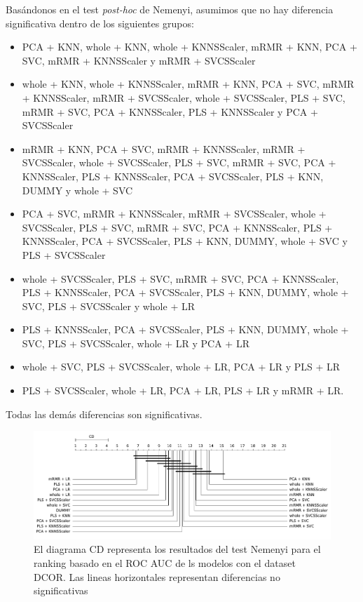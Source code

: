 \documentclass[a4paper,oneside,11pt,leqno]{article}
\begin{document}
	Basándonos en el test \textit{post-hoc} de Nemenyi, asumimos que no hay diferencia significativa dentro de los siguientes grupos:
	
	\begin{itemize}
		\item PCA + KNN, whole + KNN, whole + KNNSScaler, mRMR + KNN, PCA + SVC, mRMR + KNNSScaler y mRMR + SVCSScaler
		
		\item whole + KNN, whole + KNNSScaler, mRMR + KNN, PCA + SVC, mRMR + KNNSScaler, mRMR + SVCSScaler, whole + SVCSScaler, PLS + SVC, mRMR + SVC, PCA + KNNSScaler, PLS + KNNSScaler y PCA + SVCSScaler
		
		\item mRMR + KNN, PCA + SVC, mRMR + KNNSScaler, mRMR + SVCSScaler, whole + SVCSScaler, PLS + SVC, mRMR + SVC, PCA + KNNSScaler, PLS + KNNSScaler, PCA + SVCSScaler, PLS + KNN, DUMMY y whole + SVC
		
		\item PCA + SVC, mRMR + KNNSScaler, mRMR + SVCSScaler, whole + SVCSScaler, PLS + SVC, mRMR + SVC, PCA + KNNSScaler, PLS + KNNSScaler, PCA + SVCSScaler, PLS + KNN, DUMMY, whole + SVC y PLS + SVCSScaler
		
		\item  whole + SVCSScaler, PLS + SVC, mRMR + SVC, PCA + KNNSScaler, PLS + KNNSScaler, PCA + SVCSScaler, PLS + KNN, DUMMY, whole + SVC, PLS + SVCSScaler y whole + LR
		
		\item PLS + KNNSScaler, PCA + SVCSScaler, PLS + KNN, DUMMY, whole + SVC, PLS + SVCSScaler, whole + LR y PCA + LR
		
		\item whole + SVC, PLS + SVCSScaler, whole + LR, PCA + LR y PLS + LR
		
		\item PLS + SVCSScaler, whole + LR, PCA + LR, PLS + LR y mRMR + LR. 
	\end{itemize}
	
	Todas las demás diferencias son significativas.
	
	\begin{figure}[h]
		\includegraphics[width=\linewidth]{stat_results_dcor.pdf}
		\caption{El diagrama CD representa los resultados del test Nemenyi para el ranking basado en el ROC AUC de ls modelos con el dataset DCOR. Las lineas horizontales representan diferencias no significativas}
		\label{fig:stats_fig_dcor}
	\end{figure}
	
\end{document}
